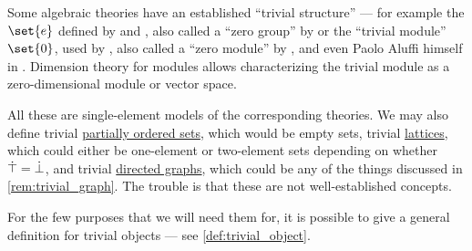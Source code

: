 \begin{concept}\label{rem:trivial_object}
  Some algebraic theories have an established \enquote{trivial structure} --- for example the  \( \set{ e } \) defined by  and , also called a \enquote{zero group} by  or the \enquote{trivial module} \( \set{ 0 } \), used by , also called a \enquote{zero module} by ,  and even Paolo Aluffi himself in \cite[341]{Aluffi2009Algebra}. Dimension theory for modules allows characterizing the trivial module as a zero-dimensional module or vector space.

  All these are single-element models of the corresponding theories. We may also define trivial \hyperref[def:partially_ordered_set]{partially ordered sets}, which would be empty sets, trivial \hyperref[def:lattice]{lattices}, which could either be one-element or two-element sets depending on whether \( \dot{\top} = \dot{\bot} \), and trivial \hyperref[def:directed_graph]{directed graphs}, which could be any of the things discussed in \cref{rem:trivial_graph}. The trouble is that these are not well-established concepts.

  For the few purposes that we will need them for, it is possible to give a general definition for trivial objects --- see \cref{def:trivial_object}.
\end{concept}

